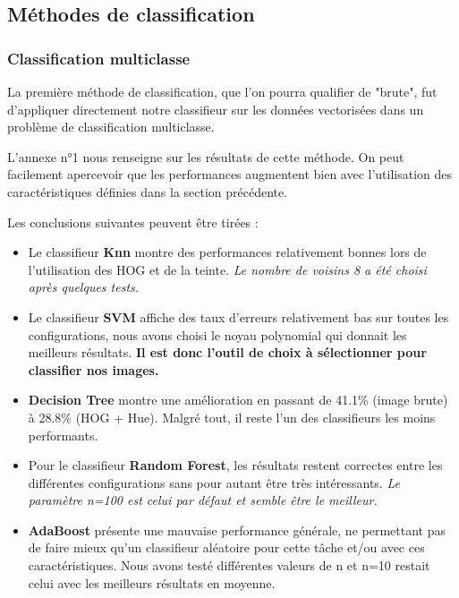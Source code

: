 \documentclass[a4paper,11pt]{article}
\begin{document}
\vspace{4mm}

\subsection{Méthodes de classification}

\subsubsection{Classification multiclasse}

La première méthode de classification, que l'on pourra qualifier de "brute", fut d'appliquer directement notre classifieur sur les données vectorisées dans un problème de classification multiclasse. 

\vspace{2mm}

\noindent L'annexe n°1 nous renseigne sur les résultats de cette méthode. On peut facilement apercevoir que les performances augmentent bien avec l'utilisation des caractéristiques définies dans la section précédente. 

\noindent Les conclusions suivantes peuvent être tirées :

\begin{itemize}[noitemsep]
    \item Le classifieur \textbf{Knn} montre des performances relativement bonnes lors de l'utilisation des HOG et de la teinte. \textit{Le nombre de voisins 8 a été choisi après quelques tests.}
    \item Le classifieur \textbf{SVM} affiche des taux d'erreurs relativement bas sur toutes les configurations, nous avons choisi le noyau polynomial qui donnait les meilleurs résultats.\textbf{ Il est donc l'outil de choix à sélectionner pour classifier nos images.}
    \item \textbf{Decision Tree} montre une amélioration en passant de 41.1\% (image brute) à 28.8\% (HOG + Hue). Malgré tout, il reste l'un des classifieurs les moins performants.
    \item Pour le classifieur \textbf{Random Forest}, les résultats restent correctes entre les différentes configurations sans pour autant être très intéressants. \textit{Le paramètre n=100 est celui par défaut et semble être le meilleur.}
    \item \textbf{AdaBoost} présente une mauvaise performance générale, ne permettant pas de faire mieux qu'un classifieur aléatoire pour cette tâche et/ou avec ces caractéristiques. Nous avons testé différentes valeurs de n et n=10 restait celui avec les meilleurs résultats en moyenne.
\end{itemize}
\end{document}
